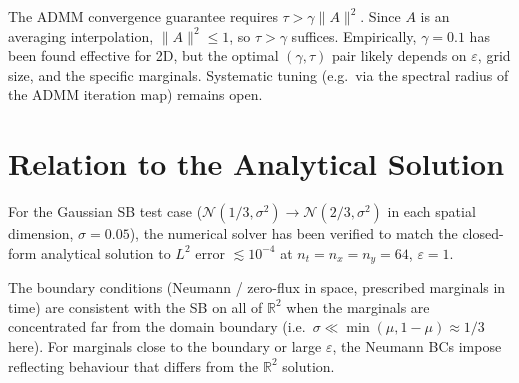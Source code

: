 \documentclass[11pt]{article}
\newcommand{\eps}{\varepsilon}
\begin{document}
The ADMM convergence guarantee requires $\tau > \gamma \|A\|^2$.
Since $A$ is an averaging interpolation, $\|A\|^2 \leq 1$, so $\tau > \gamma$ suffices.
Empirically, $\gamma = 0.1$ has been found effective for 2D, but the optimal
$(\gamma, \tau)$ pair likely depends on $\eps$, grid size, and the specific marginals.
Systematic tuning (e.g.\ via the spectral radius of the ADMM iteration map) remains
open.

\section{Relation to the Analytical Solution}

For the Gaussian SB test case ($\mathcal{N}(1/3, \sigma^2) \to \mathcal{N}(2/3, \sigma^2)$
in each spatial dimension, $\sigma = 0.05$), the numerical solver has been verified to
match the closed-form analytical solution to $L^2$ error $\lesssim 10^{-4}$ at
$n_t = n_x = n_y = 64$, $\eps = 1$.

The boundary conditions (Neumann / zero-flux in space, prescribed marginals in time)
are consistent with the SB on all of $\mathbb{R}^2$ when the marginals are concentrated
far from the domain boundary (i.e.\ $\sigma \ll \min(\mu, 1-\mu) \approx 1/3$ here).
For marginals close to the boundary or large $\eps$, the Neumann BCs impose reflecting
behaviour that differs from the $\mathbb{R}^2$ solution.
\end{document}
